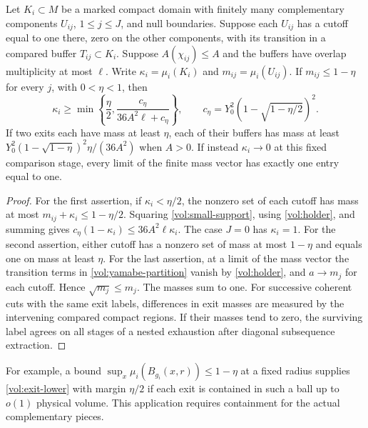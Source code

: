 \begin{proposition}
\label{vol:exit-witness}
Let \(K_i\subset M\) be a marked compact domain with finitely many
complementary components \(U_{ij}\), \(1\leq j\leq J\), and null
boundaries. Suppose each \(U_{ij}\) has a cutoff equal to one there,
zero on the other components, with its transition in a compared
buffer \(T_{ij}\subset K_i\). Suppose \(A(\chi_{ij})\leq A\) and the
buffers have overlap multiplicity at most \(\ell\).
Write \(\kappa_i=\mu_i(K_i)\) and \(m_{ij}=\mu_i(U_{ij})\).
If \(m_{ij}\leq1-\eta\) for every \(j\), with \(0<\eta<1\), then
\begin{equation}
 \kappa_i\geq
 \min\left\{\frac{\eta}{2},\frac{c_\eta}{36A^2\ell+c_\eta}\right\},
 \qquad
 c_\eta=Y_0^2(1-\sqrt{1-\eta/2})^2 .
 \label{vol:exit-lower}
\end{equation}
If two exits each have mass at least \(\eta\), each of their buffers
has mass at least
\(Y_0^2(1-\sqrt{1-\eta})^2\eta/(36A^2)\) when \(A>0\).
If instead \(\kappa_i\to0\) at this fixed comparison stage, every limit
of the finite mass vector has exactly one entry equal to one.
\end{proposition}

\begin{proof}
For the first assertion, if \(\kappa_i<\eta/2\), the nonzero set of
each cutoff has mass at most \(m_{ij}+\kappa_i\leq1-\eta/2\).
Squaring \eqref{vol:small-support}, using \eqref{vol:holder}, and
summing gives
\(c_\eta(1-\kappa_i)\leq36A^2\ell\kappa_i\).
The case \(J=0\) has \(\kappa_i=1\).
For the second assertion, either cutoff has a nonzero set of mass
at most \(1-\eta\) and equals one on mass at least \(\eta\).
For the last assertion, at a limit of the mass vector the transition
terms in \eqref{vol:yamabe-partition} vanish by \eqref{vol:holder},
and \(a\to m_j\) for each cutoff. Hence \(\sqrt{m_j}\leq m_j\).
The masses sum to one. For successive coherent cuts with the same
exit labels, differences in exit masses are measured by the
intervening compared compact regions. If their masses tend to zero,
the surviving label agrees on all stages of a nested exhaustion
after diagonal subsequence extraction.
\end{proof}

For example, a bound \(\sup_x\mu_i(B_{g_i}(x,r))\leq1-\eta\) at a
fixed radius supplies \eqref{vol:exit-lower} with margin \(\eta/2\)
if each exit is contained in such a ball up to \(o(1)\) physical
volume. This application requires containment for the actual
complementary pieces.

